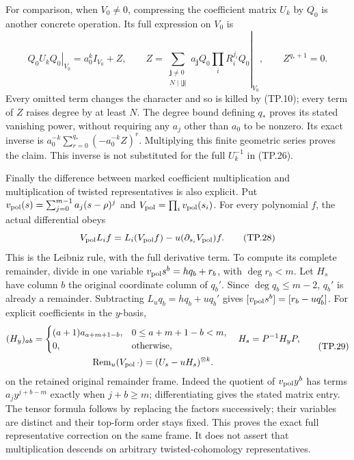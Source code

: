 For comparison, when \(V_0\ne0\), compressing the coefficient matrix
\(U_k\) by \(Q_0\) is another concrete operation. Its
full expression on \(V_0\) is
\[
 \left.Q_0U_kQ_0\right|_{V_0}
  =a_0^k I_{V_0}+Z,\qquad
 Z=\left.\sum_{\substack{\mathbf j\ne0\\N\mid|\mathbf j|}}
       a_{\mathbf j}Q_0\prod_iR_i^{j_i}Q_0\right|_{V_0},
 \qquad Z^{q_*+1}=0.
 \tag{TP.27}\label{eq:tp-unitcompression}
\]
Every omitted term changes the character and so is
killed by (TP.10); every term of \(Z\) raises degree
by at least \(N\). The degree bound defining \(q_*\)
proves its stated vanishing power, without requiring
any \(a_j\) other than \(a_0\) to be nonzero.
Its exact inverse is
\(a_0^{-k}\sum_{r=0}^{q_*}(-a_0^{-k}Z)^r\).
Multiplying this finite geometric series proves the
claim. This inverse is not substituted for the full
\(U_k^{-1}\) in (TP.26).

Finally the difference between marked coefficient
multiplication and multiplication of twisted representatives
is also explicit. Put
\(v_{\rm pol}(s)=\sum_{j=0}^{m-1}a_j(s-\rho)^j\)
and \(V_{\rm pol}=\prod_i v_{\rm pol}(s_i)\).
For every polynomial \(f\), the actual differential obeys
\[
 V_{\rm pol}L_if=L_i(V_{\rm pol}f)
                    -u(\partial_{s_i}V_{\rm pol})f.
 \tag{TP.28}\label{eq:tp-unitdefect}
\]
This is the Leibniz rule, with the full derivative term.
To compute its complete remainder, divide in one variable
\(v_{\rm pol}s^b=hq_b+r_b\), with \(\deg r_b<m\).
Let \(H_s\) have column \(b\) the original coordinate
column of \(q_b'\). Since \(\deg q_b\leq m-2\),
\(q_b'\) is already a remainder. Subtracting
\(L_uq_b=hq_b+uq_b'\) gives
\([v_{\rm pol}s^b]=[r_b-uq_b']\).
For explicit coefficients in the \(y\)-basis,
\[
 \begin{gathered}
 (H_y)_{ab}=
 \begin{cases}
 (a+1)a_{a+m+1-b},&0\leq a+m+1-b<m,\\
 0,&\hbox{otherwise},
 \end{cases}
 \quad H_s=P^{-1}H_yP,\\
 \operatorname{Rem}_u(V_{\rm pol}\,\cdot)
           =(U_s-uH_s)^{\otimes k}.
 \end{gathered}
 \tag{TP.29}\label{eq:tp-unitremainder}
\]
on the retained original remainder frame. Indeed the
quotient of \(v_{\rm pol}y^b\) has terms
\(a_jy^{j+b-m}\) exactly when \(j+b\geq m\);
differentiating gives the stated matrix entry.
The tensor formula follows by replacing the factors
successively; their variables are distinct and their
top-form order stays fixed. This proves the exact full
representative correction on the same frame. It does
not assert that multiplication descends on arbitrary
twisted-cohomology representatives.

